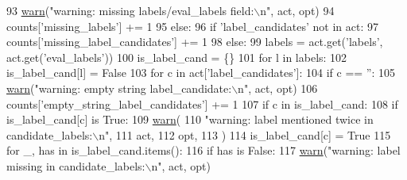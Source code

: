 \begin{DoxyCode}
93             \hyperlink{namespaceparlai_1_1scripts_1_1verify__data_ab1f264e6d69b1abe3399ba05512f8c66}{warn}(\textcolor{stringliteral}{"warning: missing labels/eval\_labels field:\(\backslash\)n"}, act, opt)
94             counts[\textcolor{stringliteral}{'missing\_labels'}] += 1
95         \textcolor{keywordflow}{else}:
96             \textcolor{keywordflow}{if} \textcolor{stringliteral}{'label\_candidates'} \textcolor{keywordflow}{not} \textcolor{keywordflow}{in} act:
97                 counts[\textcolor{stringliteral}{'missing\_label\_candidates'}] += 1
98             \textcolor{keywordflow}{else}:
99                 labels = act.get(\textcolor{stringliteral}{'labels'}, act.get(\textcolor{stringliteral}{'eval\_labels'}))
100                 is\_label\_cand = \{\}
101                 \textcolor{keywordflow}{for} l \textcolor{keywordflow}{in} labels:
102                     is\_label\_cand[l] = \textcolor{keyword}{False}
103                 \textcolor{keywordflow}{for} c \textcolor{keywordflow}{in} act[\textcolor{stringliteral}{'label\_candidates'}]:
104                     \textcolor{keywordflow}{if} c == \textcolor{stringliteral}{''}:
105                         \hyperlink{namespaceparlai_1_1scripts_1_1verify__data_ab1f264e6d69b1abe3399ba05512f8c66}{warn}(\textcolor{stringliteral}{"warning: empty string label\_candidate:\(\backslash\)n"}, act, opt)
106                         counts[\textcolor{stringliteral}{'empty\_string\_label\_candidates'}] += 1
107                     \textcolor{keywordflow}{if} c \textcolor{keywordflow}{in} is\_label\_cand:
108                         \textcolor{keywordflow}{if} is\_label\_cand[c] \textcolor{keywordflow}{is} \textcolor{keyword}{True}:
109                             \hyperlink{namespaceparlai_1_1scripts_1_1verify__data_ab1f264e6d69b1abe3399ba05512f8c66}{warn}(
110                                 \textcolor{stringliteral}{"warning: label mentioned twice in candidate\_labels:\(\backslash\)n"},
111                                 act,
112                                 opt,
113                             )
114                         is\_label\_cand[c] = \textcolor{keyword}{True}
115                 \textcolor{keywordflow}{for} \_, has \textcolor{keywordflow}{in} is\_label\_cand.items():
116                     \textcolor{keywordflow}{if} has \textcolor{keywordflow}{is} \textcolor{keyword}{False}:
117                         \hyperlink{namespaceparlai_1_1scripts_1_1verify__data_ab1f264e6d69b1abe3399ba05512f8c66}{warn}(\textcolor{stringliteral}{"warning: label missing in candidate\_labels:\(\backslash\)n"}, act, opt)

\end{DoxyCode}
